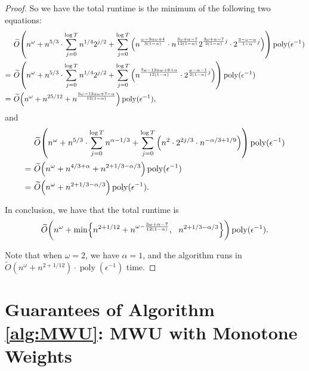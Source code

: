 \documentclass[11pt]{article}
\let\originalleft\left
\let\originalright\right
\renewcommand{\left}{\mathopen{}\mathclose\bgroup\originalleft}
\renewcommand{\right}{\aftergroup\egroup\originalright}
\newcommand{\wt}{\widetilde}
\DeclareMathOperator*{\poly}{{\mathrm{poly}}}
\begin{document}
\begin{proof}
So we have the total runtime is the minimum of the following two equations:
\begin{align*}
&~ \wt{O}\left(n^{\omega} + n^{5/3} \cdot \sum_{j=0}^{\log T} n^{1/4} 2^{j/2} + \sum_{j=0}^{\log T} \Big( n^{\frac{\omega - 3 \alpha \omega + 4}{3(1-\alpha)}} \cdot n^{\frac{3\omega+\alpha-7}{12(1-\alpha)}} 2^{\frac{3\omega+\alpha-7}{2(1-\alpha)} j} \cdot 2^{\frac{3-\omega-\alpha}{1-\alpha} j} \Big)\right) \poly(\epsilon^{-1}) \\
= &~ \wt{O}\left(n^{\omega} + n^{5/3} \cdot \sum_{j=0}^{\log T} n^{1/4} 2^{j/2} + \sum_{j=0}^{\log T} \Big( n^{\frac{7 \omega - 12 \alpha \omega + 9 + \alpha}{12(1-\alpha)} } \cdot  2^{\frac{\omega-\alpha-1}{2(1-\alpha)} j} \Big)\right) \poly(\epsilon^{-1}) \\
= &~ \wt{O}\left(n^{\omega} + n^{25/12} +  n^{\frac{9 \omega - 12 \alpha \omega + 7 - \alpha}{12(1-\alpha)}} \right) \poly(\epsilon^{-1}),
\end{align*}
and
\begin{align*}
&~ \wt{O}\left(n^{\omega} + n^{5/3} \cdot \sum_{j=0}^{\log T} n^{\alpha-1/3}  + \sum_{j=0}^{\log T} \Big( n^2 \cdot 2^{2j/3} \cdot n^{-\alpha/3+1/9} \Big)\right) \poly(\epsilon^{-1}) \\
= &~ \wt{O}\left(n^{\omega} + n^{4/3 + \alpha} + n^{2+1/3-\alpha/3} \right) \poly(\epsilon^{-1}) \\
= &~ \wt{O}\left(n^{\omega} + n^{2+1/3-\alpha/3} \right) \poly(\epsilon^{-1}).
\end{align*}

In conclusion, we have that the total runtime is
\begin{align*}
\wt{O}\left(n^{\omega} + \min\left\{n^{2+1/12} +  n^{\omega - \frac{3\omega+\alpha-7}{12(1-\alpha)}}, ~~ n^{2+1/3-\alpha/3}\right\} \right) \poly(\epsilon^{-1}).
\end{align*}


Note that when $\omega = 2$, we have $\alpha = 1$, and the algorithm runs in $\wt{O}(n^{\omega} + n^{2+1/12}) \cdot \poly(\epsilon^{-1})$ time.

\end{proof} 





\section{Guarantees of Algorithm \ref{alg:MWU}: MWU with Monotone Weights}\label{sec:MWUMonotone}
\end{document}
